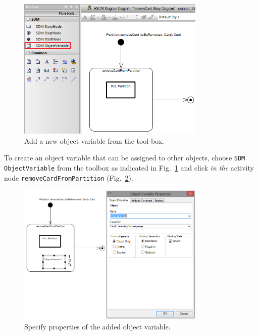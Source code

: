 \begin{figure}[htp]
\begin{center}
  \includegraphics[width=0.8\textwidth]{pics/sdmBilder/removeCard/sdm09RAW}
  \caption{Add a new object variable from the tool-box.}  
  \label{fig:tool_box}
\end{center}
\end{figure}

To create an object variable that can be assigned to other objects, choose \texttt{SDM ObjectVariable} from the toolbox as indicated in
Fig.~\ref{fig:tool_box} and click \emph{in the} activity node \texttt{removeCardFromPartition} (Fig.~\ref{fig:object_variable_properties}). 


\begin{figure}[htp]
\begin{center}
  \includegraphics[width=0.8\textwidth]{pics/sdmBilder/removeCard/sdm10RAW}
  \caption{Specify properties of the added object variable.}  
  \label{fig:object_variable_properties}
\end{center}
\end{figure}


